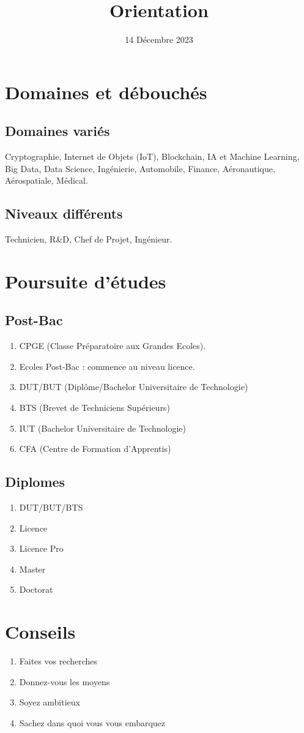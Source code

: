 \documentclass{article}
\title{Orientation}
\date{14 Décembre 2023}
\begin{document}
\maketitle
\section{Domaines et débouchés}
\subsection{Domaines variés}
Cryptographie, Internet de Objets (IoT), Blockchain, IA et Machine Learning, Big Data, Data Science, Ingénierie, Automobile, Finance, Aéronautique, Aérospatiale, Médical.
\subsection{Niveaux différents}
Technicien, R\&D, Chef de Projet, Ingénieur.
\section{Poursuite d'études}
\subsection{Post-Bac}
\begin{enumerate}
\item CPGE (Classe Préparatoire aux Grandes Ecoles).
\item Ecoles Post-Bac : commence au niveau licence.
\item DUT/BUT (Diplôme/Bachelor Universitaire de Technologie)
\item BTS (Brevet de Techniciens Supérieurs)
\item IUT (Bachelor Universitaire de Technologie)
\item CFA (Centre de Formation d'Apprentis)
\end{enumerate}
\subsection{Diplomes}
\begin{enumerate}
\item DUT/BUT/BTS
\item Licence
\item Licence Pro
\item Master
\item Doctorat
\end{enumerate}
\section{Conseils}
\begin{enumerate}
\item Faites vos recherches
\item Donnez-vous les moyens
\item Soyez ambitieux
\item Sachez dans quoi vous vous embarquez
\end{enumerate}
\end{document}
